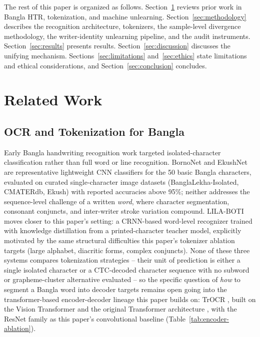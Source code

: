 \documentclass[a4paper,fleqn]{cas-dc}
\begin{document}
The rest of this paper is organized as follows. Section~\ref{sec:related}
reviews prior work in Bangla HTR, tokenization, and machine unlearning.
Section~\ref{sec:methodology} describes the recognition architecture,
tokenizers, the sample-level divergence methodology, the writer-identity
unlearning pipeline, and the audit instruments. Section~\ref{sec:results}
presents results. Section~\ref{sec:discussion} discusses the unifying
mechanism. Sections~\ref{sec:limitations} and~\ref{sec:ethics} state
limitations and ethical considerations, and Section~\ref{sec:conclusion}
concludes.

\section{Related Work}
\label{sec:related}

\subsection{OCR and Tokenization for Bangla}
\label{sec:related-ocr}

Early Bangla handwriting recognition work targeted isolated-character
classification rather than full word or line recognition. BornoNet
\citep{rabby2018bornonet} and EkushNet \citep{rabby2018ekushnet} are
representative lightweight CNN classifiers for the 50 basic Bangla
characters, evaluated on curated single-character image datasets
(BanglaLekha-Isolated, CMATERdb, Ekush) with reported accuracies above
95\%; neither addresses the sequence-level challenge of a written
\emph{word}, where character segmentation, consonant conjuncts, and
inter-writer stroke variation compound. LILA-BOTI
\citep{hossain2022lilaboti} moves closer to this paper's setting: a
CRNN-based word-level recognizer trained with knowledge distillation from
a printed-character teacher model, explicitly motivated by the same
structural difficulties this paper's tokenizer ablation targets (large
alphabet, diacritic forms, complex conjuncts). None of these three systems
compares tokenization strategies -- their unit of prediction is either a
single isolated character or a CTC-decoded character sequence with no
subword or grapheme-cluster alternative evaluated -- so the specific
question of \emph{how} to segment a Bangla word into decoder targets
remains open going into the transformer-based encoder-decoder lineage this
paper builds on: TrOCR \citep{li2023trocr}, built on the Vision
Transformer \citep{dosovitskiy2021vit} and the original Transformer
architecture \citep{vaswani2017attention}, with the ResNet family
\citep{he2016resnet} as this paper's convolutional baseline
(Table~\ref{tab:encoder-ablation}).
\end{document}
